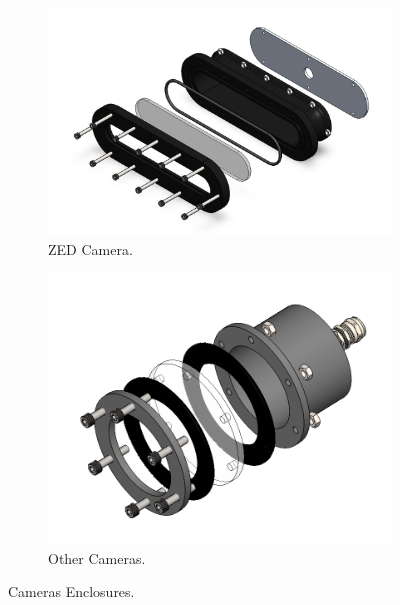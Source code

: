 \begin{figure}[h]
    \centering
    \begin{subfigure}[b]{0.45\columnwidth}
        \includegraphics[width=\textwidth]{Sections/2Design Rationale/images/ZED.png}
        \caption{ZED Camera.}
        \label{fig:zed_camera_enclosure}
    \end{subfigure}
    \hfill
    \begin{subfigure}[b]{0.5\columnwidth}
        \includegraphics[width=\textwidth]{Sections/2Design Rationale/images/Cameras.png}
        \caption{Other Cameras.}
        \label{fig:other_cameras_enclosure}
    \end{subfigure}
    \caption{Cameras Enclosures.}
    \label{fig:cameras_enclosures}
\end{figure}

